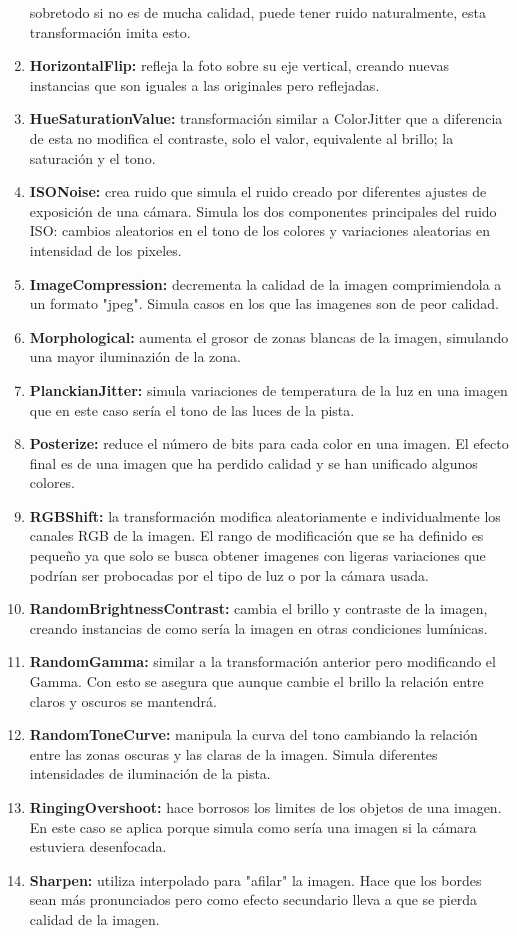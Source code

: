\documentclass[12pt]{report} %
\begin{document}
\begin{enumerate}
    sobretodo si no es de mucha calidad, puede tener ruido naturalmente, esta
    transformación imita esto.
    \item \textbf{HorizontalFlip:} refleja la foto
    sobre su eje vertical, creando nuevas instancias que son iguales a las
    originales pero reflejadas.
    \item \textbf{HueSaturationValue:}
    transformación similar a ColorJitter que a diferencia de esta no modifica
    el contraste, solo el valor, equivalente al brillo; la saturación y el
    tono.
    \item \textbf{ISONoise:} crea ruido que simula el ruido creado por
    diferentes ajustes de exposición de una cámara.  Simula los dos componentes
    principales del ruido ISO: cambios aleatorios en el tono de los colores y
    variaciones aleatorias en intensidad de los pixeles.
    \item \textbf{ImageCompression:} decrementa la calidad de la imagen
    comprimiendola a un formato "jpeg". Simula casos en los que las imagenes
    son de peor calidad.
    \item \textbf{Morphological:} aumenta el grosor de
    zonas blancas de la imagen, simulando una mayor iluminazión de la zona.
    \item \textbf{PlanckianJitter:} simula variaciones de temperatura de la luz
    en una imagen que en este caso sería el tono de las luces de la pista.
    \item \textbf{Posterize:} reduce el número de bits para cada color en una
    imagen. El efecto final es de una imagen que ha perdido calidad y se han
    unificado algunos colores.
    \item \textbf{RGBShift:} la transformación
    modifica aleatoriamente e individualmente los canales RGB de la imagen.  El
    rango de modificación que se ha definido es pequeño ya que solo se busca
    obtener imagenes con ligeras variaciones que podrían ser probocadas por el
    tipo de luz o por la cámara usada.
    \item \textbf{RandomBrightnessContrast:} cambia el brillo y contraste de la
    imagen, creando instancias de como sería la imagen en otras condiciones
    lumínicas.
    \item \textbf{RandomGamma:} similar a la transformación
    anterior pero modificando el Gamma. Con esto se asegura que aunque cambie
    el brillo la relación entre claros y oscuros se mantendrá.
    \item \textbf{RandomToneCurve:} manipula la curva del tono cambiando la relación
    entre las zonas oscuras y las claras de la imagen. Simula diferentes
    intensidades de iluminación de la pista.
    \item \textbf{RingingOvershoot:}
    hace borrosos los limites de los objetos de una imagen. En este caso se
    aplica porque simula como sería una imagen si la cámara estuviera
    desenfocada.
    \item \textbf{Sharpen:} utiliza interpolado para "afilar" la
    imagen. Hace que los bordes sean más pronunciados pero como efecto
    secundario lleva a que se pierda calidad de la imagen.
    \end{enumerate}
\end{document}
